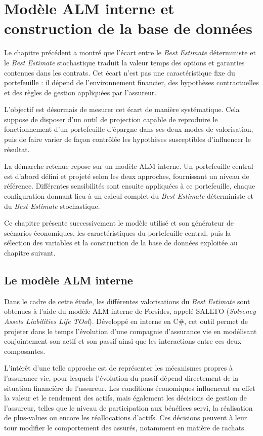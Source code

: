 \chapter{Modèle ALM interne et construction de la base de données}

Le chapitre précédent a montré que l'écart entre le \textit{Best Estimate}
déterministe et le \textit{Best Estimate} stochastique traduit la valeur temps
des options et garanties contenues dans les contrats. Cet écart n'est pas une
caractéristique fixe du portefeuille : il dépend de l'environnement financier,
des hypothèses contractuelles et des règles de gestion appliquées par
l'assureur.

L'objectif est désormais de mesurer cet écart de manière systématique. Cela
suppose de disposer d'un outil de projection capable de reproduire le
fonctionnement d'un portefeuille d'épargne dans ses deux modes de valorisation,
puis de faire varier de façon contrôlée les hypothèses susceptibles
d'influencer le résultat.

La démarche retenue repose sur un modèle ALM interne. Un portefeuille central
est d'abord défini et projeté selon les deux approches, fournissant un niveau
de référence. Différentes sensibilités sont ensuite appliquées à ce
portefeuille, chaque configuration donnant lieu à un calcul complet du
\textit{Best Estimate} déterministe et du \textit{Best Estimate} stochastique.

Ce chapitre présente successivement le modèle utilisé et son générateur de
scénarios économiques, les caractéristiques du portefeuille central, puis la
sélection des variables et la construction de la base de données exploitée au
chapitre suivant.

\section{Le modèle ALM interne}

Dans le cadre de cette étude, les différentes valorisations du \textit{Best Estimate} sont obtenues à l'aide du modèle ALM interne de Forsides, appelé SALLTO (\textit{Solvency Assets Liabilities Life TOol}). Développé en interne en C\#, cet outil permet de projeter dans le temps l'évolution d'une compagnie d'assurance vie en modélisant conjointement son actif et son passif ainsi que les interactions entre ces deux composantes.

L'intérêt d'une telle approche est de représenter les mécanismes propres à l'assurance vie, pour lesquels l'évolution du passif dépend directement de la situation financière de l'assureur. Les conditions économiques influencent en effet la valeur et le rendement des actifs, mais également les décisions de gestion de l'assureur, telles que le niveau de participation aux bénéfices servi, la réalisation de plus-values ou encore les réallocations d'actifs. Ces décisions peuvent à leur tour modifier le comportement des assurés, notamment en matière de rachats.

